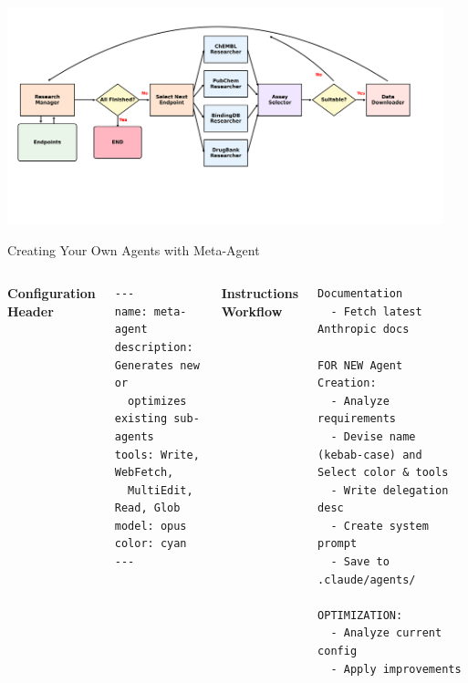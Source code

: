 \documentclass[aspectratio=169]{beamer}
\begin{document}
\begin{frame}

\centering

\includegraphics[width=0.95\textwidth]{figures/fig_agent_workflow.png}

\end{frame}

\begin{frame}[fragile]{Creating Your Own Agents with Meta-Agent}

\centering
\begin{columns}[t]


\centering
\textbf{Configuration Header}

\footnotesize
\begin{verbatim}
---
name: meta-agent
description: Generates new or
  optimizes existing sub-agents
tools: Write, WebFetch,
  MultiEdit, Read, Glob
model: opus
color: cyan
---
\end{verbatim}

\centering
\textbf{Instructions Workflow}

\footnotesize
\begin{verbatim}
Documentation
  - Fetch latest Anthropic docs

FOR NEW Agent Creation:
  - Analyze requirements
  - Devise name (kebab-case) and Select color & tools
  - Write delegation desc
  - Create system prompt
  - Save to .claude/agents/

OPTIMIZATION:
  - Analyze current config
  - Apply improvements
\end{verbatim}

\end{columns}
\end{frame}
\end{document}
